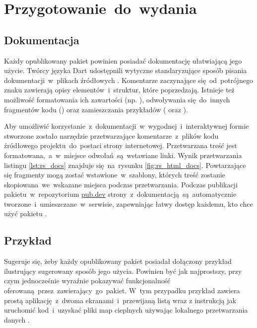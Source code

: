 \section{Przygotowanie~do~wydania}

\subsection{Dokumentacja}
Każdy opublikowany pakiet powinien posiadać dokumentację ułatwiającą jego użycie. Twórcy języka Dart udostępnili wytyczne standaryzujące sposób pisania dokumentacji~w~plikach źródłowych \cite{Dart_Doc_Guidelines}. Komentarze zaczynające się~od~potrójnego znaku \codeinline{///} zawierają opisy elementów~i~struktur, które poprzedzają. Istnieje też możliwość formatowania ich zawartości (np. ), odwoływania się~do~innych fragmentów kodu () oraz zamieszczania przykładów ( oraz ).

\bigskip


Aby umożliwić korzystanie~z~dokumentacji~w~wygodnej~i~interaktywnej formie stworzone zostało narzędzie  \cite{Dart_Doc} przetwarzające komentarze~z~plików kodu źródłowego projektu~do~postaci strony internetowej. Przetwarzana treść jest formatowana,~a~w~miejsce odwołań~są~wstawiane linki. Wynik przetwarzania listingu \ref{lst:rs_docs} znajduje się~na~rysunku \ref{fig:rs_html_docs}. Powtarzające się fragmenty mogą zostać wstawione~w~szablony, których treść zostanie skopiowana~we~wskazane miejsca podczas przetwarzania. Podczas publikacji pakietu~w~repozytorium \href{https://pub.dev/}{pub.dev} strony~z~dokumentacją~są~automatycznie tworzone~i~umieszczane~w~serwisie, zapewniając łatwy dostęp każdemu, kto chce użyć pakietu \cite{RS_Documentation}.

\bigskip
{}

\subsection{Przykład}
\label{sec:rs_example}
Sugeruje się, żeby każdy opublikowany pakiet posiadał dołączony przykład ilustrujący sugerowany sposób jego użycia. Powinien być jak najprostszy, przy czym jednocześnie wyraźnie pokazywać funkcjonalność oferowaną~przez~zawierający~go~pakiet. W~tym przypadku przykład zawiera prostą aplikację~z~dwoma ekranami~i~przewijaną listą wraz z instrukcją jak uruchomić kod~i~uzyskać pliki map cieplnych używając lokalnego przetwarzania danych \cite{RS_Example}.

